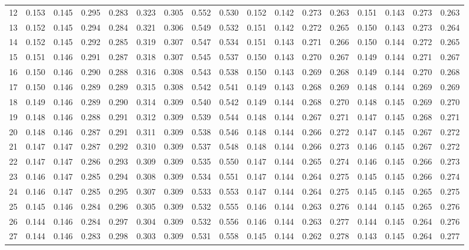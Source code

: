 \documentclass{report}
\begin{document}
\begin{appendices}
\begin{table}
\begin{tabular}{|c|cccc|cccc|cccc|cccc|}
12 & 0.153 & 0.145 & 0.295 & 0.283 & 0.323 & 0.305 & 0.552 & 0.530 & 0.152 & 0.142 & 0.273 & 0.263 & 0.151 & 0.143 & 0.273 & 0.263\\
13 & 0.152 & 0.145 & 0.294 & 0.284 & 0.321 & 0.306 & 0.549 & 0.532 & 0.151 & 0.142 & 0.272 & 0.265 & 0.150 & 0.143 & 0.273 & 0.264\\
14 & 0.152 & 0.145 & 0.292 & 0.285 & 0.319 & 0.307 & 0.547 & 0.534 & 0.151 & 0.143 & 0.271 & 0.266 & 0.150 & 0.144 & 0.272 & 0.265\\
15 & 0.151 & 0.146 & 0.291 & 0.287 & 0.318 & 0.307 & 0.545 & 0.537 & 0.150 & 0.143 & 0.270 & 0.267 & 0.149 & 0.144 & 0.271 & 0.267\\
16 & 0.150 & 0.146 & 0.290 & 0.288 & 0.316 & 0.308 & 0.543 & 0.538 & 0.150 & 0.143 & 0.269 & 0.268 & 0.149 & 0.144 & 0.270 & 0.268\\
17 & 0.150 & 0.146 & 0.289 & 0.289 & 0.315 & 0.308 & 0.542 & 0.541 & 0.149 & 0.143 & 0.268 & 0.269 & 0.148 & 0.144 & 0.269 & 0.269\\
18 & 0.149 & 0.146 & 0.289 & 0.290 & 0.314 & 0.309 & 0.540 & 0.542 & 0.149 & 0.144 & 0.268 & 0.270 & 0.148 & 0.145 & 0.269 & 0.270\\
19 & 0.148 & 0.146 & 0.288 & 0.291 & 0.312 & 0.309 & 0.539 & 0.544 & 0.148 & 0.144 & 0.267 & 0.271 & 0.147 & 0.145 & 0.268 & 0.271\\
20 & 0.148 & 0.146 & 0.287 & 0.291 & 0.311 & 0.309 & 0.538 & 0.546 & 0.148 & 0.144 & 0.266 & 0.272 & 0.147 & 0.145 & 0.267 & 0.272\\
21 & 0.147 & 0.147 & 0.287 & 0.292 & 0.310 & 0.309 & 0.537 & 0.548 & 0.148 & 0.144 & 0.266 & 0.273 & 0.146 & 0.145 & 0.267 & 0.272\\
22 & 0.147 & 0.147 & 0.286 & 0.293 & 0.309 & 0.309 & 0.535 & 0.550 & 0.147 & 0.144 & 0.265 & 0.274 & 0.146 & 0.145 & 0.266 & 0.273\\
23 & 0.146 & 0.147 & 0.285 & 0.294 & 0.308 & 0.309 & 0.534 & 0.551 & 0.147 & 0.144 & 0.264 & 0.275 & 0.145 & 0.145 & 0.266 & 0.274\\
24 & 0.146 & 0.147 & 0.285 & 0.295 & 0.307 & 0.309 & 0.533 & 0.553 & 0.147 & 0.144 & 0.264 & 0.275 & 0.145 & 0.145 & 0.265 & 0.275\\
25 & 0.145 & 0.146 & 0.284 & 0.296 & 0.305 & 0.309 & 0.532 & 0.555 & 0.146 & 0.144 & 0.263 & 0.276 & 0.144 & 0.145 & 0.265 & 0.276\\
26 & 0.144 & 0.146 & 0.284 & 0.297 & 0.304 & 0.309 & 0.532 & 0.556 & 0.146 & 0.144 & 0.263 & 0.277 & 0.144 & 0.145 & 0.264 & 0.276\\
27 & 0.144 & 0.146 & 0.283 & 0.298 & 0.303 & 0.309 & 0.531 & 0.558 & 0.145 & 0.144 & 0.262 & 0.278 & 0.143 & 0.145 & 0.264 & 0.277\\

\end{tabular}
\end{table}
\end{appendices}
\end{document}
